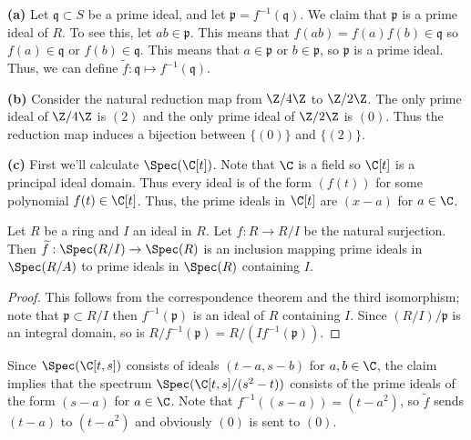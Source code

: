 \documentclass[11pt,letterpaper]{article}
\begin{document}
\begin{solution}
    \textbf{(a)} Let $\mathfrak{q}\subset S$ be a prime ideal, and let $\mathfrak{p}=f^{-1}(\mathfrak{q})$. We claim that $\mathfrak{p}$ is a prime ideal of $R$. To see this, let $ab\in \mathfrak{p}$. This means that $f(ab)=f(a)f(b)\in \mathfrak{q}$ so $f(a)\in \mathfrak{q}$ or $f(b)\in \mathfrak{q}$. This means that $a\in \mathfrak{p}$ or $b\in \mathfrak{p}$, so $\mathfrak{p}$ is a prime ideal. Thus, we can define $\widetilde{f} : \mathfrak{q} \mapsto f^{-1}(\mathfrak{q})$.
    
    \textbf{(b)} Consider the natural reduction map from $\Z /4\Z$ to $\Z/2\Z$. The only prime ideal of $\Z /4\Z$ is $(2)$ and the only prime ideal of $\Z/2\Z$ is $(0)$. Thus the reduction map induces a bijection between $\{(0)\}$ and $\{(2)\}$.  

    \textbf{(c)} First we'll calculate $\Spec(\C[t])$. Note that $\C$ is a field so $\C[t]$ is a principal ideal domain. Thus every ideal is of the form $(f(t))$ for some polynomial $f(t)\in \C[t]$. Thus, the prime ideals in $\C[t]$ are $(x-a)$ for $a\in \C$. 
    
    \begin{claim}
        Let $R$ be a ring and $I$ an ideal in $R$. Let $f : R \to R/I$ be the natural surjection. Then $\widetilde{f} : \Spec(R/I) \to \Spec(R)$ is an inclusion mapping prime ideals in $\Spec(R /A)$ to prime ideals in $\Spec(R)$ containing $I$. 
    \end{claim}
    \begin{proof}
        This follows from the correspondence theorem and the third isomorphism; note that $\mathfrak{p}\subset R / I$ then $f^{-1}(\mathfrak{p})$ is an ideal of $R$ containing $I$. Since $(R/I) /\mathfrak{p}$ is an integral domain, so is $R /f^{-1}(\mathfrak{p}) = R / (If^{-1}(\mathfrak{p}))$. 
    \end{proof}
    
    Since $\Spec(\C[t,s])$ consists of ideals $(t-a, s-b)$ for $a,b\in \C$, the claim implies that the spectrum $\Spec(\C[t,s] /(s^2-t))$ consists of the prime ideals of the form $(s-a)$ for $a\in \C$. Note that $f^{-1}((s-a))=(t-a^2)$, so $\widetilde{f}$ sends $(t-a)$ to $(t-a^2)$ and obviously $(0)$ is sent to $(0)$.
\end{solution}
\end{document}
